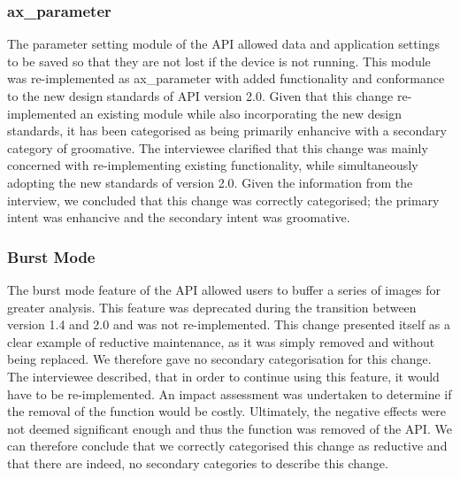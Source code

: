 \documentclass{sig-alternate}
\begin{document}
\subsubsection{ax\_parameter} %
The parameter setting module of the API allowed data and application settings to be saved so that they are not lost if the device is not running. This module was re-implemented as ax\_parameter with added functionality and conformance to the new design standards of API version 2.0. Given that this change re-implemented an existing module while also incorporating the new design standards, it has been categorised as being primarily enhancive with a secondary category of groomative. The interviewee clarified that this change was mainly concerned with re-implementing existing functionality, while simultaneously adopting the new standards of version 2.0.  Given the information from the interview, we concluded that this change was correctly categorised; the primary intent was enhancive and the secondary intent was groomative.


\subsubsection{Burst Mode} %
The burst mode feature of the API allowed users to buffer a series of images for greater analysis. This feature was deprecated during the transition between version 1.4 and 2.0 and was not re-implemented. This change presented itself as a clear example of reductive maintenance, as it was simply removed and without being replaced. We therefore gave no secondary categorisation for this change. The interviewee described, that in order to continue using this feature, it would have to be re-implemented. An impact assessment was undertaken to determine if the removal of the function would be costly. Ultimately, the negative effects were not deemed significant enough and thus the function was removed of the API. We can therefore conclude that we correctly categorised this change as reductive and that there are indeed, no secondary categories to describe this change.
\end{document}
